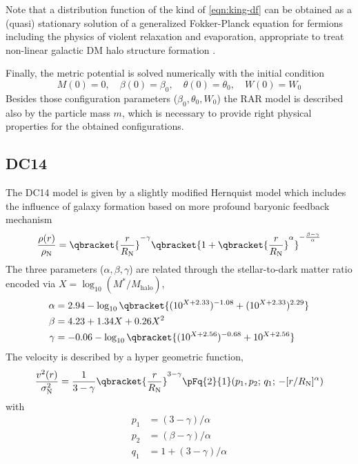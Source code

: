Note that a distribution function of the kind of \cref{eqn:king-df} can be obtained as a (quasi) stationary solution of a generalized Fokker-Planck equation for fermions including the physics of violent relaxation and evaporation, appropriate to treat non-linear galactic DM halo structure formation \citep{2004PhyA..332...89C}. 

Finally, the metric potential is solved numerically with the initial condition \begin{equation}
	M(0)			= 0,\quad
	\beta(0)	= \beta_0,\quad
	\theta(0)	= \theta_0,\quad
	W(0)			= W_0
\end{equation} Besides those configuration parameters ($\beta_0,\theta_0, W_0$) the RAR model is described also by the particle mass $m$, which is necessary to provide right physical properties for the obtained configurations. 


\subsection{DC14}
The DC14 model is given by a slightly modified Hernquist model which includes the influence of galaxy formation based on more profound baryonic feedback mechanism \citep{doi:10.1093/mnras/stu729,2016arXiv160505971K,1990ApJ...356..359H} \begin{equation}
	\frac{\rho(r)}{\rho_\mathrm{N}} = \qbracket{\frac{r}{R_\mathrm{N}}}^{-\gamma}\qbracket{1 + \qbracket{\frac{r}{R_\mathrm{N}}}^\alpha}^{-\frac{\beta - \gamma}{\alpha}}
\end{equation} The three parameters ($\alpha, \beta, \gamma$) are related through the stellar-to-dark matter ratio encoded via $X = \log_{10}(M^*/M_\mathrm{halo})$, \begin{align}
	\alpha &= 2.94 - \log_{10}\qbracket{(10^{X + 2.33})^{-1.08} + (10^{X+2.33})^{2.29}}\\
    \beta &= 4.23 + 1.34 X + 0.26 X^2\\
    \gamma &= -0.06 - \log_{10}\qbracket{(10^{X + 2.56})^{-0.68} + 10^{X+2.56}}
\end{align} The velocity is described by a hyper geometric function, \begin{equation}
	\frac{v^2(r)}{\sigma_\mathrm{N}^2} = \frac{1}{3-\gamma} \qbracket{\frac{r}{R_\mathrm{N}}}^{3-\gamma} \pFq{2}{1}(p_1,p_2;\,q_1;\,-[r/R_\mathrm{N}]^\alpha)
\end{equation} with \begin{align*}
	p_1 &= (3-\gamma)/\alpha\\
    p_2 &= (\beta-\gamma)/\alpha\\
    q_1 &= 1 + (3 - \gamma)/\alpha
\end{align*}

